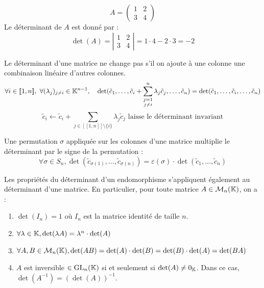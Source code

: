 \documentclass[12pt, a4paper]{report}
\begin{document}
\begin{example}
    $$A = \left(\begin{matrix} 1 & 2 \\ 3 & 4 \end{matrix}\right)$$
    Le déterminant de $A$ est donné par :
    $$\det(A) = \left|\begin{matrix} 1 & 2 \\ 3 & 4 \end{matrix}\right| = 1 \cdot 4 - 2 \cdot 3 = -2$$
\end{example}

\begin{property}
    Le déterminant d'une matrice ne change pas s'il on ajoute à une colonne une combinaison linéaire d'autres colonnes.
    $$\forall i \in [\![1,n]\!], \ \forall (\lambda_j)_{j \neq i} \in \mathbb{K}^{n-1}, \quad \det(\tilde c_1, \dots, \tilde c_i + \sum_{\substack{j=1 \\ j \neq i}}^n \lambda_j \tilde c_j, \dots, \tilde c_n) = \det(\tilde c_1, \dots, \tilde c_i, \dots, \tilde c_n)$$
    $$\tilde c_i \leftarrow \tilde c_i + \sum_{j \in [\![1,n]\!]\setminus{\{i\}}} \lambda_j \tilde c_j \text{ laisse le déterminant invariant}$$
\end{property}

\begin{property}
    Une permutation $\sigma$ appliquée sur les colonnes d'une matrice multiplie le déterminant par le signe de la permutation :
    $$\forall \sigma \in S_n, \det(\tilde c_{\sigma(1)}, \dots, \tilde c_{\sigma(n)}) = \varepsilon(\sigma) \cdot \det(\tilde c_1, \dots, \tilde c_n)$$
\end{property}

\begin{property}
    Les propriétés du déterminant d'un endomorphisme s'appliquent également au déterminant d'une matrice. En particulier, pour toute matrice $A \in \mathcal M_n(\mathbb{K})$, on a :
    \begin{enumerate}
        \item $\det(I_n) = 1$ où $I_n$ est la matrice identité de taille $n$.
        \item $\forall \lambda \in \mathbb{K}, \det(\lambda A) = \lambda^n \cdot \det(A)$
        \item $\forall A, B \in \mathcal M_n(\mathbb{K}), \det(AB) = \det(A) \cdot \det(B) = \det(B) \cdot \det(A) = \det(BA)$
        \item $A$ est inversible $\in \mathrm{GL}_n(\mathbb{K})$ si et seulement si $\det(A) \ne 0_{\mathbb{K}}$. Dans ce cas, $\det(A^{-1}) = (\det(A))^{-1}$.
    \end{enumerate}
\end{property}
\end{document}
